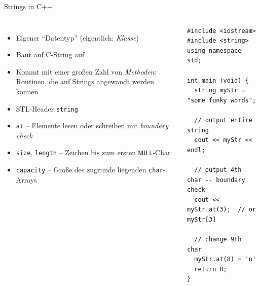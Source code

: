 \begin{frame}[fragile]{Strings in C++}
%
\begin{columns}[T]
\begin{itemize}
\item Eigener \enquote{Datentyp} (eigentlich: \emph{Klasse})
\item Baut auf C-String auf
\item Kommt mit einer großen Zahl von \emph{Methoden}: Routinen, die auf Strings angewandt werden können
\item STL-Header \texttt{string}
\item \texttt{at} -- Elemente lesen oder schreiben mit \emph{boundary check}
\item \texttt{size}, \texttt{length} -- Zeichen bis zum ersten \texttt{NULL}-Char
\item \texttt{capacity} -- Größe des zugrunde liegenden \texttt{char}-Arrays
\end{itemize}
%
\vspace{-12pt}
\begin{codebox}
\begin{verbatim}
#include <iostream>
#include <string>
using namespace std;

int main (void) {
  string myStr = "some funky words";
  
  // output entire string
  cout << myStr << endl;
  
  // output 4th char -- boundary check
  cout << myStr.at(3);  // or myStr[3]
  
  // change 9th char
  myStr.at(8) = 'n'
  return 0;
}
\end{verbatim}
\end{codebox}
\end{columns}
%
\end{frame}


